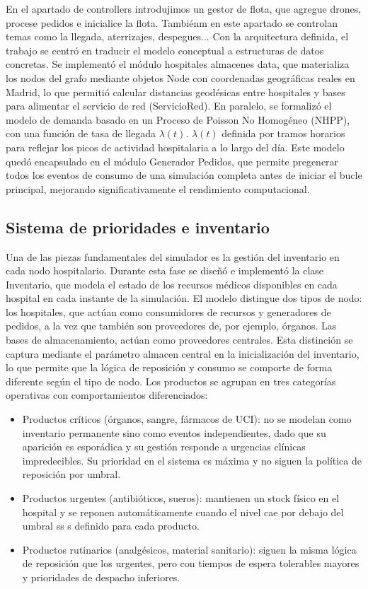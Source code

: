 \documentclass[11pt, a4paper]{article} %
\begin{document}
En el apartado de controllers introdujimos un gestor de flota, que agregue drones, procese pedidos e inicialice la flota. Tambiénm en este apartado se controlan temas como la llegada, aterrizajes, despegues... Con la arquitectura definida, el trabajo se centró en traducir el modelo conceptual a estructuras de datos concretas. Se implementó el módulo hospitales almacenes data, que materializa los nodos del grafo mediante objetos Node con coordenadas geográficas reales en Madrid, lo que permitió calcular distancias geodésicas entre hospitales y bases para alimentar el servicio de red (ServicioRed). En paralelo, se formalizó el modelo de demanda basado en un Proceso de Poisson No Homogéneo (NHPP), con una función de tasa de llegada $\lambda(t)$. $\lambda(t)$ definida por tramos horarios para reflejar los picos de actividad hospitalaria a lo largo del día. Este modelo quedó encapsulado en el módulo Generador Pedidos, que permite pregenerar todos los eventos de consumo de una simulación completa antes de iniciar el bucle principal, mejorando significativamente el rendimiento computacional.

\subsection{Sistema de prioridades e inventario}
Una de las piezas fundamentales del simulador es la gestión del inventario en cada nodo hospitalario. Durante esta fase se diseñó e implementó la clase Inventario, que modela el estado de los recursos médicos disponibles en cada hospital en cada instante de la simulación. El modelo distingue dos tipos de nodo: los hospitales, que actúan como consumidores de recursos y generadores de pedidos, a la vez que también son proveedores de, por ejemplo, órganos. Las bases de almacenamiento, actúan como proveedores centrales. Esta distinción se captura mediante el parámetro almacen central en la inicialización del inventario, lo que permite que la lógica de reposición y consumo se comporte de forma diferente según el tipo de nodo. Los productos se agrupan en tres categorías operativas con comportamientos diferenciados:

\begin{itemize}
    \item Productos críticos (órganos, sangre, fármacos de UCI): no se modelan como inventario permanente sino como eventos independientes, dado que su aparición es esporádica y su gestión responde a urgencias clínicas impredecibles. Su prioridad en el sistema es máxima y no siguen la política de reposición por umbral.
    \item Productos urgentes (antibióticos, sueros): mantienen un stock físico en el hospital y se reponen automáticamente cuando el nivel cae por debajo del umbral ss s definido para cada producto.
    \item Productos rutinarios (analgésicos, material sanitario): siguen la misma lógica de reposición que los urgentes, pero con tiempos de espera tolerables mayores y prioridades de despacho inferiores.
\end{itemize}
\end{document}
